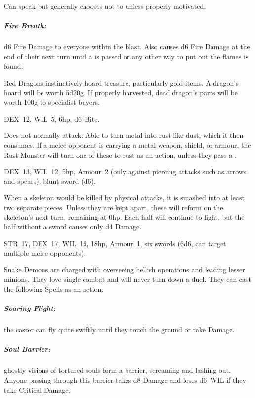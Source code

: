 \documentclass[itdr]{subfiles}
\begin{document}
Can speak but generally chooses not to unless properly motivated.

\subparagraph{Fire Breath:} d6 Fire Damage to everyone within the blast. Also causes d6 Fire Damage at the end of their next turn until a  is passed or any other way to put out the flames is found.

Red Dragons instinctively hoard treasure, particularly gold items. A dragon's hoard will be worth 5d20g. If properly harvested, dead dragon's parts will be worth 100g to specialist buyers.

\vfill
\break

\vfill

DEX~12, WIL~5, 6hp, d6~Bite.

Does not normally attack. Able to turn metal into rust-like dust, which it then consumes. If a melee opponent is carrying a metal weapon, shield, or armour, the Rust Monster will turn one of these to rust as an action, unless they pass a .

\vfill

DEX~13, WIL~12, 5hp, Armour~2 (only against piercing attacks such as arrows and spears), blunt sword (d6).

When a skeleton would be killed by physical attacks, it is smashed into at least two separate pieces. Unless they are kept apart, these will reform on the skeleton's next turn, remaining at 0hp. Each half will continue to fight, but the half without a sword causes only d4 Damage.

\vfill


\vspace{-2ex}

STR~17, DEX~17, WIL~16, 18hp, Armour~1, six swords (6d6, can target multiple melee opponents).

Snake Demons are charged with overseeing hellish operations and leading lesser minions. They love single combat and will never turn down a duel. They can cast the following Spells as an action.

\vfill
\break

\subparagraph{Soaring Flight:} the caster can fly quite swiftly until they touch the ground or take Damage.

\subparagraph{Soul Barrier:} ghostly visions of tortured souls form a barrier, screaming and lashing out. Anyone passing through this barrier takes d8 Damage and loses d6~WIL if they take Critical Damage.
\end{document}
